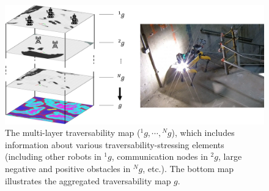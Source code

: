 \documentclass[letterpaper, 10pt, conference]{ieeeconf}      %
\begin{document}


\begin{figure}[t]
  \centering
  \includegraphics[width=\linewidth]{spot_iros/graphics/MLT.png}
  \caption{The multi-layer traversability map (${}^{1}g,\cdots,{}^{N}g$), which includes information about various traversability-stressing elements (including other robots in ${}^1g$, communication nodes in ${}^2g$, large negative and positive obstacles in ${}^Ng$, etc.). The bottom map illustrates the aggregated traversability map $g$.
  }
  
  
  \label{fig:layered_costmap}
\end{figure}
\end{document}
